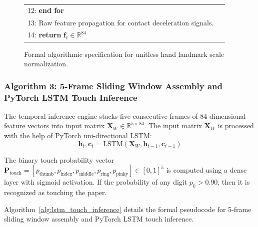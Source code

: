 \begin{figure}[htbp]
\begin{minipage}{0.92\textwidth}
\begin{tabular}{|p{0.96\linewidth}|}
{\small 12: \textbf{end for}} \\
{\small 13: Raw feature propagation for contact deceleration signals.} \\
{\small 14: \textbf{return} $\mathbf{f}_t \in \mathbb{R}^{84}$} \\
\hline
\end{tabular}
\end{minipage}
\caption{Formal algorithmic specification for unitless hand landmark scale normalization.}
\label{alg:scale_normalization}
\end{figure}

\subsubsection{Algorithm 3: 5-Frame Sliding Window Assembly and PyTorch LSTM Touch Inference}
The temporal inference engine stacks five consecutive frames of 84-dimensional feature vectors into input matrix $\mathbf{X}_W \in \mathbb{R}^{5 \times 84}$. The input matrix $\mathbf{X}_W$ is processed with the help of PyTorch uni-directional LSTM:
\begin{equation}
\mathbf{h}_t, \mathbf{c}_t = \text{LSTM}(\mathbf{X}_W, \mathbf{h}_{t-1}, \mathbf{c}_{t-1})
\label{eq:lstm_forward_app}
\end{equation}

The binary touch probability vector $\mathbf{P}_{\text{touch}} = [p_{\text{thumb}}, p_{\text{index}}, p_{\text{middle}}, p_{\text{ring}}, p_{\text{pinky}}] \in [0, 1]^5$ is computed using a dense layer with sigmoid activation. If the probability of any digit $p_k > 0.90$, then it is recognized as touching the paper.

Algorithm~\ref{alg:lstm_touch_inference} details the formal pseudocode for 5-frame sliding window assembly and PyTorch LSTM touch inference.

